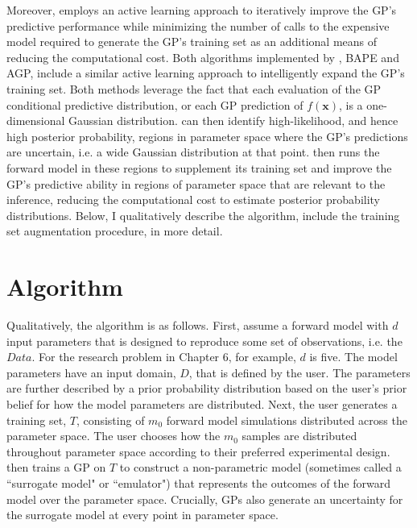 Moreover, \approxposterior employs an active learning approach to iteratively improve the GP's predictive performance while minimizing the number of calls to the expensive model required to generate the GP's training set as an additional means of reducing the computational cost. Both algorithms implemented by \approxposterior, BAPE and AGP, include a similar active learning approach to intelligently expand the GP's training set. Both methods leverage the fact that each evaluation of the GP conditional predictive distribution, or each GP prediction of $f(\textbf{x})$, is a one-dimensional Gaussian distribution.  \approxposterior can then identify high-likelihood, and hence high posterior probability, regions in parameter space where the GP's predictions are uncertain, i.e. a wide Gaussian distribution at that point.  \approxposterior then runs the forward model in these regions to supplement its training set and improve the GP's predictive ability in regions of parameter space that are relevant to the inference, reducing the computational cost to estimate posterior probability distributions. Below, I qualitatively describe the \approxposterior algorithm, include the training set augmentation procedure, in more detail.

\section{\approxposterior Algorithm} \label{AP:sec:app}

Qualitatively, the \approxposterior algorithm is as follows. First, assume a forward model with $d$ input parameters that is designed to reproduce some set of observations, i.e. the $Data$. For the research problem in Chapter 6, for example, $d$ is five. The model parameters have an input domain, $D$, that is defined by the user. The parameters are further described by a prior probability distribution based on the user's prior belief for how the model parameters are distributed.  Next, the user generates a training set, $T$, consisting of $m_0$ forward model simulations distributed across the parameter space. The user chooses how the $m_0$ samples are distributed throughout parameter space according to their preferred experimental design. \approxposterior then trains a GP on $T$ to construct a non-parametric model (sometimes called a ``surrogate model" or ``emulator") that represents the outcomes of the forward model over the parameter space. Crucially, GPs also generate an uncertainty for the surrogate model at every point in parameter space.

